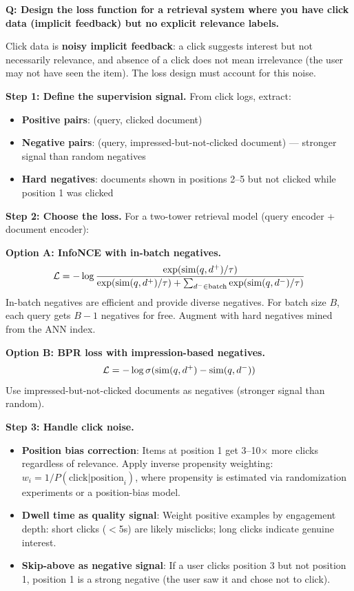 \begin{interviewq}
\textbf{Q: Design the loss function for a retrieval system where you have click data (implicit feedback) but no explicit relevance labels.}

 \quad {} \quad \badgefreq{\freqhigh}

\stronganswer Click data is \textbf{noisy implicit feedback}: a click suggests interest but not necessarily relevance, and absence of a click does not mean irrelevance (the user may not have seen the item). The loss design must account for this noise.

\textbf{Step 1: Define the supervision signal.} From click logs, extract:
\begin{itemize}
    \item \textbf{Positive pairs}: (query, clicked document)
    \item \textbf{Negative pairs}: (query, impressed-but-not-clicked document) --- stronger signal than random negatives
    \item \textbf{Hard negatives}: documents shown in positions 2--5 but not clicked while position 1 was clicked
\end{itemize}

\textbf{Step 2: Choose the loss.} For a two-tower retrieval model (query encoder + document encoder):

\textbf{Option A: InfoNCE with in-batch negatives.}
$$\mathcal{L} = -\log \frac{\exp(\text{sim}(q, d^+)/\tau)}{\exp(\text{sim}(q, d^+)/\tau) + \sum_{d^- \in \text{batch}} \exp(\text{sim}(q, d^-)/\tau)}$$
In-batch negatives are efficient and provide diverse negatives. For batch size $B$, each query gets $B-1$ negatives for free. Augment with hard negatives mined from the ANN index.

\textbf{Option B: BPR loss with impression-based negatives.}
$$\mathcal{L} = -\log\sigma(\text{sim}(q, d^+) - \text{sim}(q, d^-))$$
Use impressed-but-not-clicked documents as negatives (stronger signal than random).

\textbf{Step 3: Handle click noise.}
\begin{itemize}
    \item \textbf{Position bias correction}: Items at position 1 get 3--10$\times$ more clicks regardless of relevance. Apply inverse propensity weighting: $w_i = 1/P(\text{click} | \text{position}_i)$, where propensity is estimated via randomization experiments or a position-bias model.
    \item \textbf{Dwell time as quality signal}: Weight positive examples by engagement depth: short clicks ($<$5s) are likely misclicks; long clicks indicate genuine interest.
    \item \textbf{Skip-above as negative signal}: If a user clicks position 3 but not position 1, position 1 is a strong negative (the user saw it and chose not to click).
\end{itemize}


\end{interviewq}
